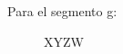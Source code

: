Para el segmento g:
\begin{figure}[H]
  \begin{center}
    \begin{Karnaugh}{X}{Y}{Z}{W}
    \end{Karnaugh}
  \end{center}
\end{figure}
